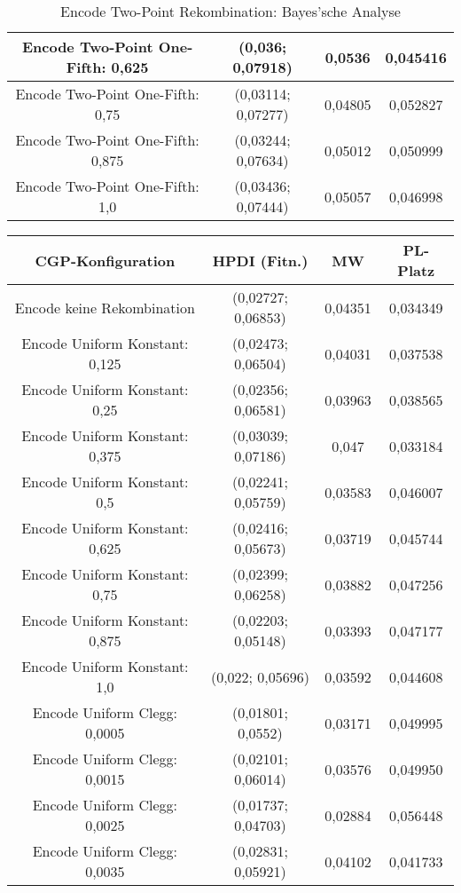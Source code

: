 \begin{table}[H]
\begin{tabular}{c | c | c | c}
		\hline
		Encode Two-Point One-Fifth: 0,625 & (0,036; 0,07918) & 0,0536 & 0,045416\\
		\hline
		Encode Two-Point One-Fifth: 0,75 & (0,03114; 0,07277) & 0,04805 & 0,052827\\
		\hline
		Encode Two-Point One-Fifth: 0,875 & (0,03244; 0,07634) & 0,05012 & 0,050999\\
		\hline
		Encode Two-Point One-Fifth: 1,0 & (0,03436; 0,07444) & 0,05057 & 0,046998\\
	\end{tabular}
	\label{table:encodeTwoPointBayesian}
	\caption{Encode Two-Point Rekombination: Bayes'sche Analyse}
\end{table}

\begin{table}[H]
	\centering
	\begin{tabular}{c | c | c | c}
		\textbf{CGP-Konfiguration} & \textbf{HPDI (Fitn.)} & \textbf{MW} & \textbf{PL-Platz}\\
		\hline
		Encode keine Rekombination & (0,02727; 0,06853) & 0,04351 & 0,034349\\
		\hline
		Encode Uniform Konstant: 0,125 & (0,02473; 0,06504) & 0,04031 & 0,037538\\
		\hline
		Encode Uniform Konstant: 0,25 & (0,02356; 0,06581) & 0,03963 & 0,038565\\
		\hline
		Encode Uniform Konstant: 0,375 & (0,03039; 0,07186) & 0,047 & 0,033184\\
		\hline
		Encode Uniform Konstant: 0,5 & (0,02241; 0,05759) & 0,03583 & 0,046007\\
		\hline
		Encode Uniform Konstant: 0,625 & (0,02416; 0,05673) & 0,03719 & 0,045744\\
		\hline
		Encode Uniform Konstant: 0,75 & (0,02399; 0,06258) & 0,03882 & 0,047256\\
		\hline
		Encode Uniform Konstant: 0,875 & (0,02203; 0,05148) & 0,03393 & 0,047177\\
		\hline
		Encode Uniform Konstant: 1,0 & (0,022; 0,05696) & 0,03592 & 0,044608\\
		\hline
		Encode Uniform Clegg: 0,0005 & (0,01801; 0,0552) & 0,03171 & 0,049995\\
		\hline
		Encode Uniform Clegg: 0,0015 & (0,02101; 0,06014) & 0,03576 & 0,049950\\
		\hline
		Encode Uniform Clegg: 0,0025 & (0,01737; 0,04703) & 0,02884 & 0,056448\\
		\hline
		Encode Uniform Clegg: 0,0035 & (0,02831; 0,05921) & 0,04102 & 0,041733\\

\end{tabular}
\end{table}
